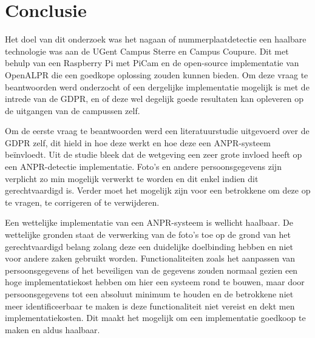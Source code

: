 
\chapter{Conclusie}
\label{ch:conclusie}


Het doel van dit onderzoek was het nagaan of nummerplaatdetectie een haalbare technologie was aan de UGent Campus Sterre en Campus Coupure. Dit met behulp van een Raspberry Pi met PiCam en de open-source implementatie van OpenALPR die een goedkope oplossing zouden kunnen bieden. Om deze vraag te beantwoorden werd onderzocht of een dergelijke implementatie mogelijk is met de intrede van de GDPR, en of deze wel degelijk goede resultaten kan opleveren op de uitgangen van de campussen zelf.

Om de eerste vraag te beantwoorden werd een literatuurstudie uitgevoerd over de GDPR zelf, dit hield in hoe deze werkt en hoe deze een ANPR-systeem beïnvloedt. Uit de studie bleek dat de wetgeving een zeer grote invloed heeft op een ANPR-detectie implementatie. Foto's en andere persoonsgegevens zijn verplicht zo min mogelijk verwerkt te worden en dit enkel indien dit gerechtvaardigd is. Verder moet het mogelijk zijn voor een betrokkene om deze op te vragen, te corrigeren of te verwijderen.

Een wettelijke implementatie van een ANPR-systeem is wellicht haalbaar. De wettelijke gronden staat de verwerking van de foto's toe op de grond van het gerechtvaardigd belang zolang deze een duidelijke doelbinding hebben en niet voor andere zaken gebruikt worden. Functionaliteiten zoals het aanpassen van persoonsgegevens of het beveiligen van de gegevens zouden normaal gezien een hoge implementatiekost hebben om hier een systeem rond te bouwen, maar door persoonsgegevens tot een absoluut minimum te houden en de betrokkene niet meer identificeerbaar te maken is deze functionaliteit niet vereist en dekt men implementatiekosten. Dit maakt het mogelijk om een implementatie goedkoop te maken en aldus haalbaar.

